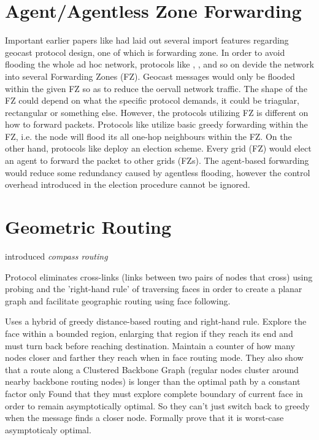 \documentclass[conference]{IEEEtran}
\begin{document}
\section{Agent/Agentless Zone Forwarding}

Important earlier papers like \cite{Basagni1998} had laid out several import features regarding geocast protocol design, one of which is forwarding zone. In order to avoid flooding the whole ad hoc network, protocols like \cite{Basagni1998}, \cite{Camp2003}, \cite{Liao} and so on devide the network into several Forwarding Zones (FZ). Geocast messages would 
only be flooded within the given FZ so as to reduce the oervall network traffic. The shape of the FZ could depend on what the specific protocol demands, it could be triagular, rectangular or something else. However, the protocols utilizing FZ is different on how to forward packets. Protocols like \cite{Basagni1998} utilize basic greedy forwarding within
the FZ, i.e. the node will flood its all one-hop neighbours within the FZ. On the other hand, protocols like \cite{Liao} deploy an election scheme. Every grid (FZ) would elect an agent to forward the packet to other grids (FZs). The agent-based forwarding would reduce some redundancy caused by agentless flooding, however the control overhead 
introduced in the election procedure cannot be ignored.

\section{Geometric Routing}

\cite{Kranakis99compassrouting} introduced \emph{compass routing}

\cite{Kim:2005:GRM:1251203.1251219} Protocol eliminates cross-links (links between two pairs of nodes that cross) using probing and the 'right-hand rule' of traversing faces in order to create a planar graph and facilitate geographic routing using face following.

\cite{Kuhn2003} Uses a hybrid of greedy distance-based routing and right-hand rule.
Explore the face within a bounded region, enlarging that region if they reach its end and must turn back before reaching destination.
Maintain a counter of how many nodes closer and farther they reach when in face routing mode.
They also show that a route along a Clustered Backbone Graph (regular nodes cluster around nearby backbone routing nodes) is longer than the optimal path by a constant factor only
Found that they must explore complete boundary of current face in order to remain asymptotically optimal.
So they can't just switch back to greedy when the message finds a closer node.
Formally prove that it is worst-case asymptoticaly optimal.
\end{document}
